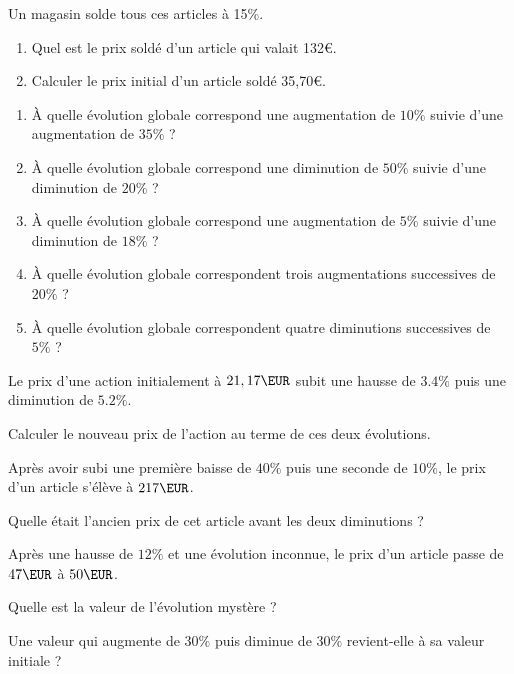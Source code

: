 \exo

Un magasin solde tous ces articles à 15\%.

\begin{enumerate}
\item Quel est le prix soldé d'un article qui valait 132\euro.
\item Calculer le prix initial d'un article soldé 35,70\euro .
\end{enumerate}

\exo 

\begin{enumerate}
\item  À quelle évolution globale correspond une augmentation de $10\%$ suivie d'une augmentation de $35\%$ ?
\item  À quelle évolution globale correspond une diminution de $50\%$ suivie d'une diminution de $20\%$ ?

\item  À quelle évolution globale correspond une augmentation de $5\%$ suivie d'une diminution de $18\%$ ?

\item À quelle évolution globale correspondent trois augmentations successives de $20\%$ ?

\item À quelle évolution globale correspondent quatre diminutions successives de $5 \%$ ?
\end{enumerate}

\exo 

 Le prix d'une action initialement  à $21,17\EUR$ subit une hausse de $3.4\%$ puis une diminution de $5.2\%$.

Calculer le nouveau prix de l'action au terme de ces deux évolutions. 

\exo 

 Après avoir subi une première baisse de $40\%$ puis une seconde de $10\%$, le prix d'un article s'élève à $217\EUR$.

Quelle était l'ancien prix de cet article avant les deux diminutions ?

\exo 

 Après une hausse de $12\%$ et une évolution inconnue, le prix d'un article passe de $47\EUR$ à $50\EUR$.

Quelle est la valeur de l'évolution mystère ?

\exo 

 Une valeur qui augmente de $30\%$ puis diminue de $30\%$ revient-elle à sa valeur initiale ? 

